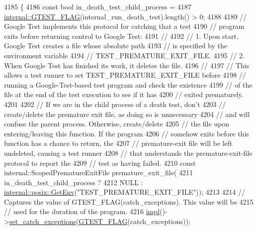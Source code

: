 \begin{DoxyCode}
4185                   \{
4186   \textcolor{keyword}{const} \textcolor{keywordtype}{bool} in\_death\_test\_child\_process =
4187       \hyperlink{gtest-port_8h_a828f4e34a1c4b510da50ec1563e3562a}{internal::GTEST\_FLAG}(internal\_run\_death\_test).length() > 0;
4188 
4189   \textcolor{comment}{// Google Test implements this protocol for catching that a test}
4190   \textcolor{comment}{// program exits before returning control to Google Test:}
4191   \textcolor{comment}{//}
4192   \textcolor{comment}{//   1. Upon start, Google Test creates a file whose absolute path}
4193   \textcolor{comment}{//      is specified by the environment variable}
4194   \textcolor{comment}{//      TEST\_PREMATURE\_EXIT\_FILE.}
4195   \textcolor{comment}{//   2. When Google Test has finished its work, it deletes the file.}
4196   \textcolor{comment}{//}
4197   \textcolor{comment}{// This allows a test runner to set TEST\_PREMATURE\_EXIT\_FILE before}
4198   \textcolor{comment}{// running a Google-Test-based test program and check the existence}
4199   \textcolor{comment}{// of the file at the end of the test execution to see if it has}
4200   \textcolor{comment}{// exited prematurely.}
4201 
4202   \textcolor{comment}{// If we are in the child process of a death test, don't}
4203   \textcolor{comment}{// create/delete the premature exit file, as doing so is unnecessary}
4204   \textcolor{comment}{// and will confuse the parent process.  Otherwise, create/delete}
4205   \textcolor{comment}{// the file upon entering/leaving this function.  If the program}
4206   \textcolor{comment}{// somehow exits before this function has a chance to return, the}
4207   \textcolor{comment}{// premature-exit file will be left undeleted, causing a test runner}
4208   \textcolor{comment}{// that understands the premature-exit-file protocol to report the}
4209   \textcolor{comment}{// test as having failed.}
4210   \textcolor{keyword}{const} internal::ScopedPrematureExitFile premature\_exit\_file(
4211       in\_death\_test\_child\_process ?
4212       NULL : \hyperlink{namespacetesting_1_1internal_1_1posix_a1d5e3da5a27eed25986859fa83cafe95}{internal::posix::GetEnv}(\textcolor{stringliteral}{"TEST\_PREMATURE\_EXIT\_FILE"}));
4213 
4214   \textcolor{comment}{// Captures the value of GTEST\_FLAG(catch\_exceptions).  This value will be}
4215   \textcolor{comment}{// used for the duration of the program.}
4216   \hyperlink{classtesting_1_1UnitTest_a4df5d11a58affb337d7fa62eaa07690e}{impl}()->\hyperlink{classtesting_1_1internal_1_1UnitTestImpl_aefec23506cd772c3abc536cda301d926}{set\_catch\_exceptions}(\hyperlink{gtest-port_8h_a828f4e34a1c4b510da50ec1563e3562a}{GTEST\_FLAG}(catch\_exceptions));

\end{DoxyCode}
